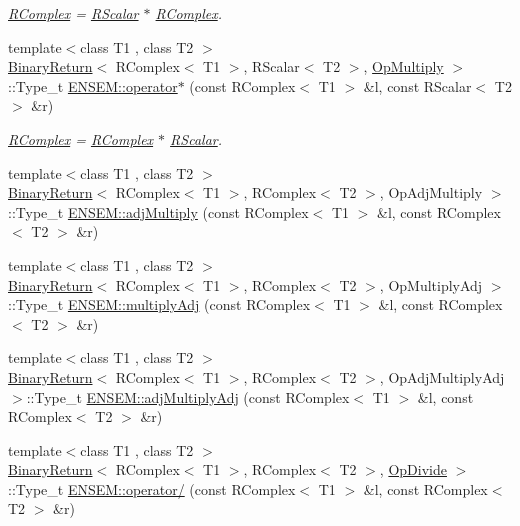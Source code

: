 \begin{DoxyCompactItemize}
\begin{DoxyCompactList}\small\item\em \mbox{\hyperlink{classENSEM_1_1RComplex}{R\+Complex}} = \mbox{\hyperlink{classENSEM_1_1RScalar}{R\+Scalar}} $\ast$ \mbox{\hyperlink{classENSEM_1_1RComplex}{R\+Complex}}. \end{DoxyCompactList}\item 
{\footnotesize template$<$class T1 , class T2 $>$ }\\\mbox{\hyperlink{structBinaryReturn}{Binary\+Return}}$<$ R\+Complex$<$ T1 $>$, R\+Scalar$<$ T2 $>$, \mbox{\hyperlink{structOpMultiply}{Op\+Multiply}} $>$\+::Type\+\_\+t \mbox{\hyperlink{group__rcomplex_gad99c4b787d010bff9c7b17d7c88e597a}{E\+N\+S\+E\+M\+::operator$\ast$}} (const R\+Complex$<$ T1 $>$ \&l, const R\+Scalar$<$ T2 $>$ \&r)
\begin{DoxyCompactList}\small\item\em \mbox{\hyperlink{classENSEM_1_1RComplex}{R\+Complex}} = \mbox{\hyperlink{classENSEM_1_1RComplex}{R\+Complex}} $\ast$ \mbox{\hyperlink{classENSEM_1_1RScalar}{R\+Scalar}}. \end{DoxyCompactList}\item 
{\footnotesize template$<$class T1 , class T2 $>$ }\\\mbox{\hyperlink{structBinaryReturn}{Binary\+Return}}$<$ R\+Complex$<$ T1 $>$, R\+Complex$<$ T2 $>$, Op\+Adj\+Multiply $>$\+::Type\+\_\+t \mbox{\hyperlink{group__rcomplex_ga0ee080478b142a857cd13cd07d2e17dd}{E\+N\+S\+E\+M\+::adj\+Multiply}} (const R\+Complex$<$ T1 $>$ \&l, const R\+Complex$<$ T2 $>$ \&r)
\item 
{\footnotesize template$<$class T1 , class T2 $>$ }\\\mbox{\hyperlink{structBinaryReturn}{Binary\+Return}}$<$ R\+Complex$<$ T1 $>$, R\+Complex$<$ T2 $>$, Op\+Multiply\+Adj $>$\+::Type\+\_\+t \mbox{\hyperlink{group__rcomplex_ga7147ce299498e423c79851ee598dcde3}{E\+N\+S\+E\+M\+::multiply\+Adj}} (const R\+Complex$<$ T1 $>$ \&l, const R\+Complex$<$ T2 $>$ \&r)
\item 
{\footnotesize template$<$class T1 , class T2 $>$ }\\\mbox{\hyperlink{structBinaryReturn}{Binary\+Return}}$<$ R\+Complex$<$ T1 $>$, R\+Complex$<$ T2 $>$, Op\+Adj\+Multiply\+Adj $>$\+::Type\+\_\+t \mbox{\hyperlink{group__rcomplex_gac9d1c7be9449dc3fbb0a17d63a51dc17}{E\+N\+S\+E\+M\+::adj\+Multiply\+Adj}} (const R\+Complex$<$ T1 $>$ \&l, const R\+Complex$<$ T2 $>$ \&r)
\item 
{\footnotesize template$<$class T1 , class T2 $>$ }\\\mbox{\hyperlink{structBinaryReturn}{Binary\+Return}}$<$ R\+Complex$<$ T1 $>$, R\+Complex$<$ T2 $>$, \mbox{\hyperlink{structOpDivide}{Op\+Divide}} $>$\+::Type\+\_\+t \mbox{\hyperlink{group__rcomplex_ga60f2bd381cb984f9f438b894a2aef66f}{E\+N\+S\+E\+M\+::operator/}} (const R\+Complex$<$ T1 $>$ \&l, const R\+Complex$<$ T2 $>$ \&r)

\end{DoxyCompactItemize}
